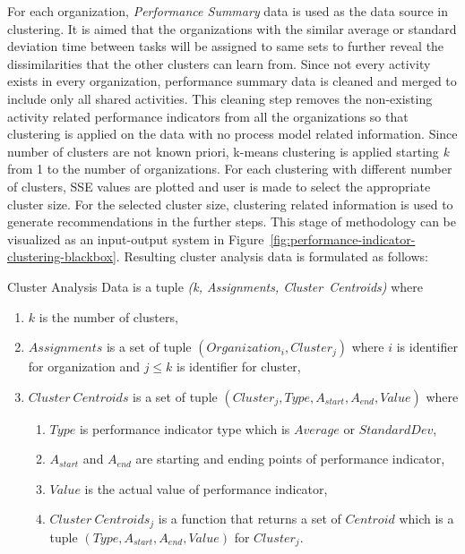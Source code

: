 For each organization, \textit{Performance Summary} data is used as the data source in clustering. It is aimed that the organizations with the similar average or standard deviation time between tasks will be assigned to same sets to further reveal the dissimilarities that the other clusters can learn from. Since not every activity exists in every organization, performance summary data is cleaned and merged to include only all shared activities. This cleaning step removes the non-existing activity related performance indicators from all the organizations so that clustering is applied on the data with no process model related information. Since number of clusters are not known priori, k-means clustering is applied starting \textit{k} from 1 to the number of organizations. For each clustering with different number of clusters, SSE values are plotted and user is made to select the appropriate cluster size. For the selected cluster size, clustering related information is used to generate recommendations in the further steps. This stage of methodology can be visualized as an input-output system in Figure~\ref{fig:performance-indicator-clustering-blackbox}. Resulting cluster analysis data is formulated as follows:

\theoremstyle{definition}
\begin{definition}
Cluster Analysis Data is a tuple \textit{(k, Assignments, Cluster\ Centroids)} where
\begin{enumerate}
	\item $k$ is the number of clusters,
	\item $Assignments$ is a set of tuple $(Organization_{i}, Cluster_{j})$ where $i$ is identifier for organization and $j \leq k$ is identifier for cluster,
	\item $Cluster\ Centroids$ is a set of tuple $(Cluster_{j}, Type, A_{start}, A_{end}, Value)$ where
		\begin{enumerate}
			\item $Type$ is performance indicator type which is $Average$ or $StandardDev$,
			\item $A_{start}$ and $A_{end}$ are starting and ending points of performance indicator,
			\item $Value$ is the actual value of performance indicator,
			\item $Cluster\ Centroids_{j}$ is a function that returns a set of $Centroid$ which is a tuple $(Type, A_{start}, A_{end}, Value)$ for $Cluster_{j}$.
		\end{enumerate}	
\end{enumerate}
\end{definition}
 
